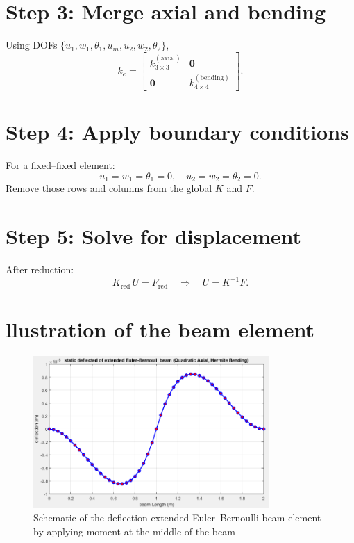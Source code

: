 \documentclass{article}
\begin{document}
	\section*{Step 3: Merge axial and bending}
	
	Using DOFs \(\{u_1,w_1,\theta_1,u_m,u_2,w_2,\theta_2\}\),
	\[
	k_e
	= \begin{bmatrix}
		k_{3\times3}^{(\mathrm{axial})} & \mathbf{0} \\
		\mathbf{0} & k_{4\times4}^{(\mathrm{bending})}
	\end{bmatrix}.
	\]
	
	\section*{Step 4: Apply boundary conditions}
	
	For a fixed–fixed element:
	\[
	u_1=w_1=\theta_1=0,\quad
	u_2=w_2=\theta_2=0.
	\]
	Remove those rows and columns from the global \(K\) and \(F\).
	
	\section*{Step 5: Solve for displacement}
	
	After reduction:
	\[
	K_{\mathrm{red}}\,U = F_{\mathrm{red}}
	\quad\Longrightarrow\quad
	U = K^{-1}F.
	\]
	
	\section*{llustration of the beam element}
	\begin{figure}[ht]
		\centering
		\includegraphics[width=0.8\textwidth]{Quadratic_Axial.png}
		\caption{Schematic of the deflection extended Euler--Bernoulli beam element by applying moment at the middle of the beam}
		\label{fig:beam-element}
	\end{figure}
	
\end{document}
